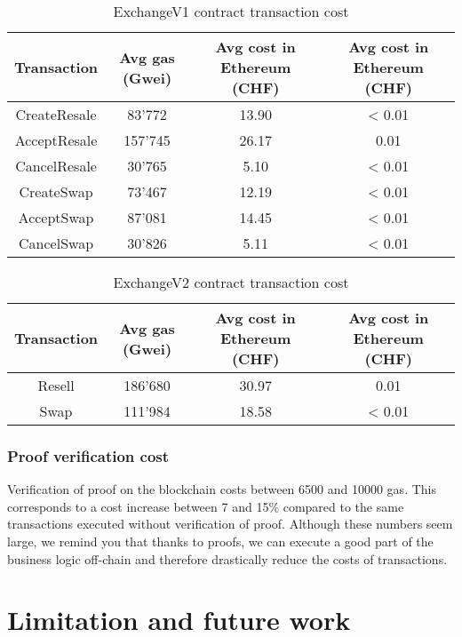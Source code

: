 \documentclass[a4paper,11pt,oneside]{report}
\begin{document}
\begin{table}[h!]
\begin{center}
\begin{NiceTabular}{ |c||c|c|c| }
 \hline
 Transaction & Avg gas (Gwei) & Avg cost in Ethereum (CHF) & Avg cost in Ethereum (CHF) \\
 \hline \hline
 CreateResale & 83'772 & 13.90 & < 0.01 \\
 AcceptResale & 157'745 & 26.17 & 0.01 \\
 CancelResale & 30'765 & 5.10 & < 0.01 \\
 CreateSwap & 73'467 & 12.19 & < 0.01 \\
 AcceptSwap & 87'081 & 14.45 & < 0.01 \\
 CancelSwap & 30'826 & 5.11 & < 0.01 \\
 \hline
\end{NiceTabular}
\caption{ExchangeV1 contract transaction cost}
\label{table:exchangeV1_contract_transaction_cost}
\end{center}
\end{table}

\begin{table}[h!]
\begin{center}
\begin{NiceTabular}{ |c||c|c|c| }
 \hline
 Transaction & Avg gas (Gwei) & Avg cost in Ethereum (CHF) & Avg cost in Ethereum (CHF) \\
 \hline \hline
 Resell & 186'680 & 30.97 & 0.01 \\
 Swap & 111'984 & 18.58 & < 0.01 \\
 \hline
\end{NiceTabular}
\caption{ExchangeV2 contract transaction cost}
\label{table:exchangeV2_contract_transaction_cost}
\end{center}
\end{table}

\subsection{Proof verification cost}
Verification of proof on the blockchain costs between 6500 and 10000 gas. This corresponds to a cost increase between 7 and 15\% compared to the same transactions executed without verification of proof. Although these numbers seem large, we remind you that thanks to proofs, we can execute a good part of the business logic off-chain and therefore drastically reduce the costs of transactions.

\chapter{Limitation and future work}
\end{document}
